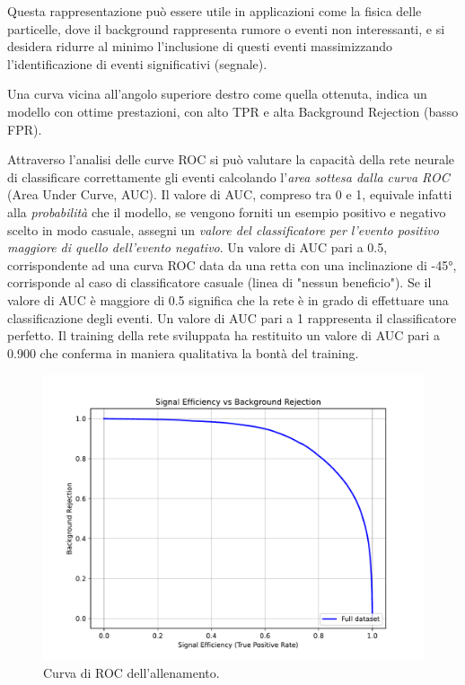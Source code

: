        Questa rappresentazione può essere utile in applicazioni come la fisica delle particelle, dove il background rappresenta rumore o eventi non interessanti, e si desidera ridurre al minimo l'inclusione di questi eventi massimizzando l'identificazione di eventi significativi (segnale).

        Una curva vicina all'angolo superiore destro come quella ottenuta, indica un modello con ottime prestazioni, con alto TPR e alta Background Rejection (basso FPR).

        Attraverso l'analisi delle curve ROC si può valutare la capacità della rete neurale di classificare correttamente gli eventi calcolando l'\textit{area sottesa dalla curva ROC} (Area Under Curve, AUC). Il valore di AUC, compreso tra 0 e 1, equivale infatti alla \textit{probabilità} che il modello, se vengono forniti un esempio positivo e negativo scelto in modo casuale, assegni un \textit{valore del classificatore per l'evento positivo maggiore di quello dell'evento negativo}. Un valore di AUC pari a \num{0.5}, corrispondente ad una curva ROC data da una retta con una inclinazione di \ang{-45}, corrisponde al caso di classificatore casuale (linea di "nessun beneficio"). Se il valore di AUC è maggiore di \num{0.5} significa che la rete è in grado di effettuare una classificazione degli eventi. Un valore di AUC pari a \num{1} rappresenta il classificatore perfetto. Il training della rete sviluppata ha restituito un valore di AUC pari a \num{0.900} che conferma in maniera qualitativa la bontà del training.

        \begin{figure}[p]
            \centering
            \includegraphics[width=1\linewidth]{res/fig/3-chapter/8-roc-curve.pdf}
            \caption{Curva di ROC dell'allenamento.}
            \label{fig:ROC-curve}
        \end{figure}

\newpage

